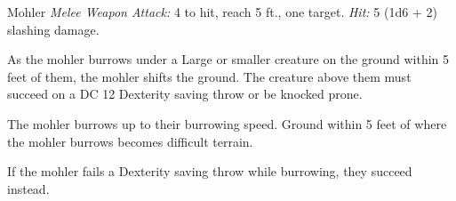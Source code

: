 \documentclass[10pt,a4paper,twoside,bg=print,twocolumn,openany,nodeprecatedcode]{dndbook}
\begin{document}
\begin{DndMonster}[float=t]{Mohler}
\DndMonsterBasics[
armor-class = {12},
hit-points = {\DndDice{2d6 + 2}},
speed = {20 ft., burrow 40 ft.}
]
\DndMonsterAbilityScores[
 str = 7,
 dex = 14,
 con = 12,
 int = 2,
 wis = 12,
 cha = 5
]
\DndMonsterDetails[
senses = {blindsight 20 ft., tremorsense 40 ft., passive perception 11},
challenge = 1/4,
]
\textsl{Melee Weapon Attack:} 4 to hit, reach 5 ft., one target. \textsl{Hit:} 5 (1d6 + 2) slashing damage.

As the mohler burrows under a Large or smaller creature on the ground within 5 feet of them, the mohler shifts the ground. The creature above them must succeed on a DC 12 Dexterity saving throw or be knocked prone.

The mohler burrows up to their burrowing speed. Ground within 5 feet of where the mohler burrows becomes difficult terrain.

If the mohler fails a Dexterity saving throw while burrowing, they succeed instead.

\end{DndMonster}
\end{document}
